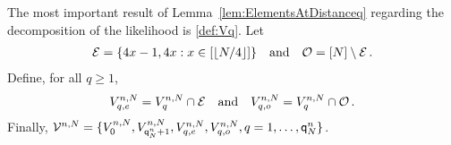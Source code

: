 The most important result of Lemma~\ref{lem:ElementsAtDistanceq} regarding the decomposition of the likelihood is \eqref{def:Vq}. 
Let 
\begin{gather*}
\mathcal{E}=\{4x-1,4x : x\in[\left\lfloor N/4\right\rfloor]\}\quad\mbox{and}\quad \mathcal{O}=[N]\setminus\mathcal{E}\,.
\end{gather*}
Define, for all $q\ge 1$,
\[
V_{q,e}^{n,N}= V_{q}^{n,N}\cap \mathcal{E}\quad\mbox{and}\quad V_{q,o}^{n,N}= V_{q}^{n,N}\cap \mathcal{O}\,.
\]
Finally, $\mathcal{V}^{n,N}=\{V_0^{n,N},V_{{\mathsf{q}}^{n}_{N}+1}^{n,N},V_{q,e}^{n,N},V_{q,o}^{n,N},q=1,\ldots,{\mathsf{q}}^{n}_{N}\}$.

